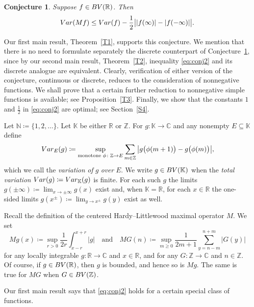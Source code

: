 \documentclass[leqno,11pt]{amsart}
\numberwithin{equation}{section}
\numberwithin{theorem}{section}
\newtheorem{conjecture}{Conjecture}
\newcommand{\KK}{\mathbb{K}}
\newcommand{\RR}{\mathbb{R}}
\newcommand{\ZZ}{\mathbb{Z}}
\newcommand{\CC}{\mathbb{C}}
\newcommand{\NN}{\mathbb{N}}
\newcommand{\Var}{{\rm Var}}
\newcommand{\BV}{{\rm BV}}
\begin{document}
	\begin{conjecture} \label{conj2}
		Suppose $f\in\BV(\RR)$. Then
		\begin{equation} \label{eq:conj2}
		\Var (Mf) \leq \Var (f) - \frac12 \big||f(\infty)|-|f(-\infty)|\big|.
		\end{equation}
	\end{conjecture}
	
	Our first main result, Theorem~\ref{T1}, supports this conjecture. We mention that there is no need to formulate separately the discrete 
	counterpart of Conjecture~\ref{conj2}, since by our second main result, Theorem~\ref{T2}, inequality \eqref{eq:conj2} and its discrete analogue are equivalent. Clearly, verification of either version of
	the conjecture, continuous or discrete, reduces to the consideration of nonnegative functions. We shall prove that a certain further reduction to nonnegative simple functions is available; see Proposition~\ref{T3}. Finally, we show that the constants $1$ 
	and $\frac12$ in \eqref{eq:conj2} are optimal; see Section~\ref{S4}.
	
	Let $\NN \coloneqq \{1,2,\dots\}$. Let $\KK$ be either $\RR$ or $\ZZ$. For $g \colon \KK \to \CC$ and any nonempty $E \subseteq \KK$ define
	\[
	\Var_E (g) \coloneqq
	\sup_{\text{monotone } \phi \colon \ZZ \to E} \sum_{m \in \ZZ} \big|g\big(\phi(m+1)\big) - g\big(\phi(m)\big)\big|, 
	\]
	which we call the \emph{variation of} $g$ \emph{over} $E$.
	We write $g \in \BV(\KK)$ when the \emph{total variation} $\Var (g) \coloneqq \Var_\KK(g)$ is finite. For each such $g$ the limits 
	$g(\pm\infty) \coloneqq \lim_{x \to \pm \infty} g(x)$ exist and, when $\KK = \RR$, for each $x \in \RR$ the one-sided limits $g(x^\pm) \coloneqq \lim_{y \to x^\pm} g(y)$ 
	exist as well. 
	
	Recall the definition of the centered Hardy--Littlewood maximal operator $M$. We set
	\[
	Mg(x) \coloneqq \sup_{r>0} \frac{1}{2r} \int_{x-r}^{x+r} |g|
	\quad \text{and} \quad
	MG(n) \coloneqq \sup_{m\ge0} \frac{1}{2m+1} \sum_{y  = n - m}^{n + m} |G(y)|
	\]
	for any locally integrable $g \colon \RR \to \CC$ and $x \in \RR$, and for any $G \colon \ZZ \to \CC$ and $n \in \ZZ$. Of course, if $g \in \BV(\RR)$, then $g$ is bounded, and hence so is $Mg$. The same is true for $MG$ when $G \in \BV(\ZZ)$.
	
	Our first main result says that \eqref{eq:conj2} holds for a certain special class of functions. 
	
\end{document}
